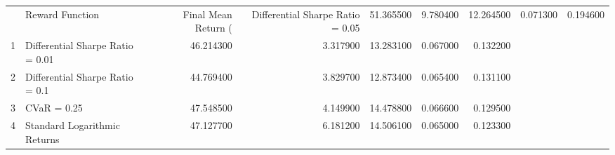 \begin{tabular}{llrrrrr}
\toprule
 & Reward Function & Final Mean Return (%
 & Differential Sharpe Ratio = 0.05 & 51.365500 & 9.780400 & 12.264500 & 0.071300 & 0.194600 \\
1 & Differential Sharpe Ratio = 0.01 & 46.214300 & 3.317900 & 13.283100 & 0.067000 & 0.132200 \\
2 & Differential Sharpe Ratio = 0.1 & 44.769400 & 3.829700 & 12.873400 & 0.065400 & 0.131100 \\
3 & CVaR = 0.25 & 47.548500 & 4.149900 & 14.478800 & 0.066600 & 0.129500 \\
4 & Standard Logarithmic Returns & 47.127700 & 6.181200 & 14.506100 & 0.065000 & 0.123300 \\
\bottomrule
\end{tabular}
